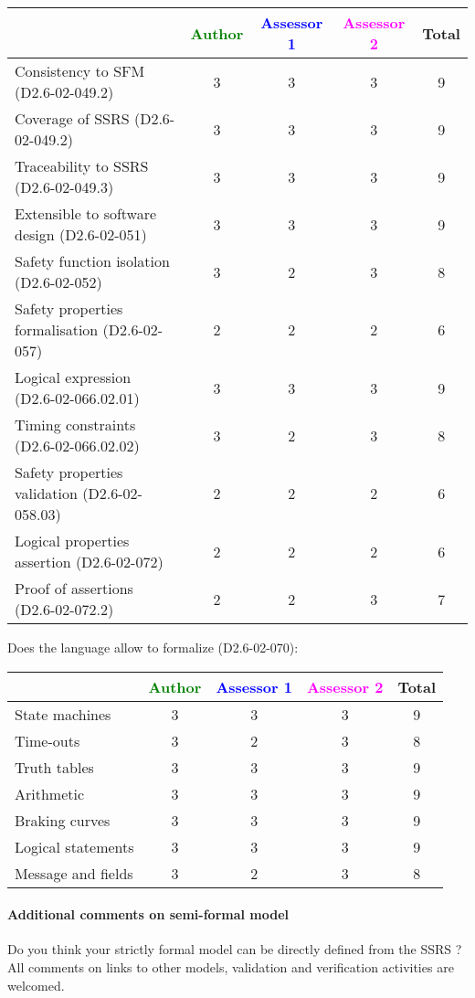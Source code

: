 \begin{tabular}{|l | c | c | c | c|}
\hline
& \textcolor{green}{Author} & \textcolor{blue}{Assessor 1} & \textcolor{magenta}{Assessor 2} & Total \\
\hline 
Consistency to SFM (D2.6-02-049.2) & 3 & 3 &3 & 9 \\
\hline
Coverage of SSRS (D2.6-02-049.2)  &3 & 3 &3 &  9 \\
\hline
Traceability to  SSRS (D2.6-02-049.3)  &3 & 3 &3 &  9 \\
\hline
Extensible to software design (D2.6-02-051)  &3 & 3 &3 & 9  \\
\hline
Safety function isolation (D2.6-02-052)  &  3& 2 &3 & 8  \\
\hline 
Safety properties formalisation (D2.6-02-057)  &  2&
2&2 & 6  \\
\hline
Logical expression (D2.6-02-066.02.01)  &  3&3 &3 & 9  \\
\hline
Timing constraints (D2.6-02-066.02.02)  &  3&2 &3 & 8 \\
\hline
Safety properties validation (D2.6-02-058.03)  &  2& 2 &2 & 6  \\
\hline
Logical properties assertion (D2.6-02-072)  &  2& 2 &2 & 6 \\
\hline
Proof of assertions (D2.6-02-072.2)  &  2 & 2 &3 & 7 \\
\hline
\end{tabular}

Does the language allow to  formalize (D2.6-02-070):

\begin{tabular}{|l | c | c | c | c|}
\hline
& \textcolor{green}{Author} & \textcolor{blue}{Assessor 1} & \textcolor{magenta}{Assessor 2} & Total \\
\hline 
State machines  & 3 & 3 &3 & 9 \\
\hline
Time-outs  & 3 & 2 &3 & 8 \\
\hline
Truth tables  & 3 & 3 &3 & 9 \\
\hline
Arithmetic  & 3& 3 &3 & 9 \\
\hline
Braking curves  & 3& 3 &3 & 9 \\
\hline
Logical statements & 3& 3 &3 & 9 \\
\hline
Message and fields &3 & 2 &3 & 8 \\
\hline
\end{tabular}

\paragraph{Additional comments on semi-formal  model} Do you think your strictly formal  model can be directly defined from the SSRS ?
All comments on links to  other models, validation and verification activities are welcomed.

